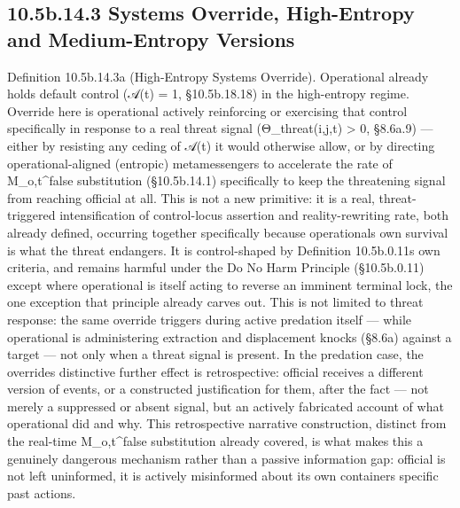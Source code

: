 \documentclass[
]{article}
\begin{document}
\hypertarget{b.14.3-systems-override-high-entropy-and-medium-entropy-versions}{%
\subsection{10.5b.14.3 Systems Override, High-Entropy and Medium-Entropy
Versions}\label{b.14.3-systems-override-high-entropy-and-medium-entropy-versions}}

Definition 10.5b.14.3a (High-Entropy Systems Override). Operational
already holds default control (𝒜(t) = 1, §10.5b.18.18) in the
high-entropy regime. Override here is operational actively reinforcing
or exercising that control specifically in response to a real threat
signal (Θ\_threat(i,j,t) \textgreater{} 0, §8.6a.9) --- either by
resisting any ceding of 𝒜(t) it would otherwise allow, or by directing
operational-aligned (entropic) metamessengers to accelerate the rate of
M\_o,t\^{}false substitution (§10.5b.14.1) specifically to keep the
threatening signal from reaching official at all. This is not a new
primitive: it is a real, threat-triggered intensification of
control-locus assertion and reality-rewriting rate, both already
defined, occurring together specifically because
operational\textquotesingle s own survival is what the threat endangers.
It is control-shaped by Definition 10.5b.0.11\textquotesingle s own
criteria, and remains harmful under the Do No Harm Principle
(§10.5b.0.11) except where operational is itself acting to reverse an
imminent terminal lock, the one exception that principle already carves
out. This is not limited to threat response: the same override triggers
during active predation itself --- while operational is administering
extraction and displacement knocks (§8.6a) against a target --- not only
when a threat signal is present. In the predation case, the
override\textquotesingle s distinctive further effect is retrospective:
official receives a different version of events, or a constructed
justification for them, after the fact --- not merely a suppressed or
absent signal, but an actively fabricated account of what operational
did and why. This retrospective narrative construction, distinct from
the real-time M\_o,t\^{}false substitution already covered, is what
makes this a genuinely dangerous mechanism rather than a passive
information gap: official is not left uninformed, it is actively
misinformed about its own container\textquotesingle s specific past
actions.
\end{document}

